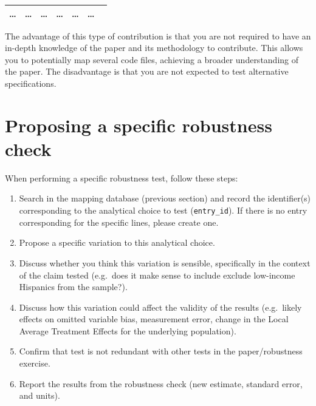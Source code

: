 \documentclass[]{book}
\begin{document}
\begin{longtable}[]{@{}lllllll@{}}
\begin{minipage}[t]{0.07\columnwidth}
\ldots{}\strut
\end{minipage} & \begin{minipage}[t]{0.08\columnwidth}\raggedright
\ldots{}\strut
\end{minipage} & \begin{minipage}[t]{0.12\columnwidth}\raggedright
\ldots{}\strut
\end{minipage} & \begin{minipage}[t]{0.19\columnwidth}\raggedright
\ldots{}\strut
\end{minipage} & \begin{minipage}[t]{0.18\columnwidth}\raggedright
\ldots{}\strut
\end{minipage} & \begin{minipage}[t]{0.12\columnwidth}\raggedright
\ldots{}\strut
\end{minipage}\tabularnewline
\bottomrule
\end{longtable}

The advantage of this type of contribution is that you are not required to have an in-depth knowledge of the paper and its methodology to contribute. This allows you to potentially map several code files, achieving a broader understanding of the paper. The disadvantage is that you are not expected to test alternative specifications.

\hypertarget{proposing-a-specific-robustness-check}{%
\section{Proposing a specific robustness check}\label{proposing-a-specific-robustness-check}}

When performing a specific robustness test, follow these steps:

\begin{enumerate}
\def\labelenumi{\arabic{enumi}.}
\item
  Search in the mapping database (previous section) \citep[is this referring to the reproduction tree diagram?]{fhoces} and record the identifier(s) corresponding to the analytical choice to test (\texttt{entry\_id}). If there is no entry corresponding for the specific lines, please create one.
\item
  Propose a specific variation to this analytical choice.
\item
  Discuss whether you think this variation is sensible, specifically in the context of the claim tested (e.g.~does it make sense to include exclude low-income Hispanics from the sample?).
\item
  Discuss how this variation could affect the validity of the results (e.g.~likely effects on omitted variable bias, measurement error, change in the Local Average Treatment Effects for the underlying population).
\item
  Confirm that test is not redundant with other tests in the paper/robustness exercise.
\item
  Report the results from the robustness check (new estimate, standard error, and units).
\end{enumerate}
\end{document}
